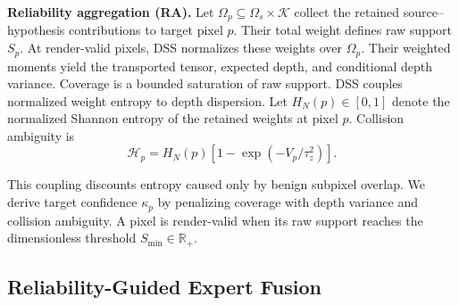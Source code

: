 \documentclass[letterpaper,10pt,conference]{ieeeconf}
\newcommand{\R}{\mathbb{R}}
\newcommand{\I}{\mathbf{I}}
\begin{document}


\textbf{Reliability aggregation (RA).}
Let $\Omega_p\subseteq\Omega_s\times\mathcal K$ collect the retained
source--hypothesis contributions to target pixel $p$. Their total weight
defines raw support $S_p$. At render-valid pixels,
DSS normalizes these weights over $\Omega_p$. Their weighted moments yield the
transported tensor, expected depth, and conditional depth variance. Coverage
is a bounded saturation of raw support.
DSS couples normalized weight entropy to depth dispersion. Let
$H_N(p)\in[0,1]$ denote the normalized Shannon entropy of the retained weights
at pixel $p$. Collision
ambiguity is
\begin{equation}
 \mathcal H_p
 =H_N(p)\left[1-\exp(-V_p/\tau_z^2)\right].
\label{eq:collision-entropy}
\end{equation}

This coupling discounts entropy caused only by benign subpixel overlap. We
derive target confidence $\kappa_p$ by penalizing coverage with depth variance
and collision ambiguity. A pixel is render-valid when its raw support reaches
the dimensionless threshold $S_{\min}\in\R_+$.

\subsection{Reliability-Guided Expert Fusion}
\end{document}

